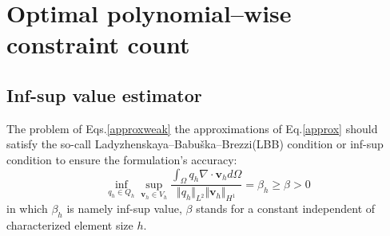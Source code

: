 \section{Optimal polynomial--wise constraint count}
\subsection{Inf-sup value estimator}
The problem of Eqs.\eqref{approxweak} the approximations of Eq.\eqref{approx} should satisfy the so-call Ladyzhenskaya–Babuška–Brezzi(LBB) condition or inf-sup condition \cite{bathe1996} to ensure the formulation's accuracy:
\begin{equation}
    \inf_{q_h \in Q_h} \sup_{\boldsymbol v_h \in V_h} \frac{\int_{\Omega} q_h \nabla \cdot \boldsymbol v_h d\Omega}{\Vert q_h \Vert_{L^2} \Vert \boldsymbol v_h \Vert_{H^1}} = \beta_h \ge \beta > 0
\end{equation}
in which $\beta_h$ is namely inf-sup value, $\beta$ stands for a constant independent of characterized element size $h$.


